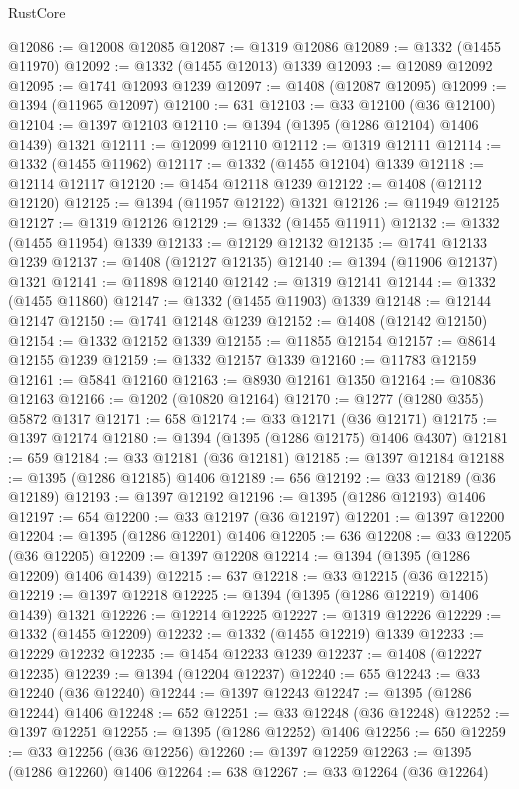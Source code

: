 \begin{lexlean}{RustCore}
\begin{coremodule}
@12086 := @12008 @12085
@12087 := @1319 @12086
@12089 := @1332 (@1455 @11970)
@12092 := @1332 (@1455 @12013) @1339
@12093 := @12089 @12092
@12095 := @1741 @12093 @1239
@12097 := @1408 (@12087 @12095)
@12099 := @1394 (@11965 @12097)
@12100 := 631
@12103 := @33 @12100 (@36 @12100)
@12104 := @1397 @12103
@12110 := @1394 (@1395 (@1286 @12104) @1406 @1439) @1321
@12111 := @12099 @12110
@12112 := @1319 @12111
@12114 := @1332 (@1455 @11962)
@12117 := @1332 (@1455 @12104) @1339
@12118 := @12114 @12117
@12120 := @1454 @12118 @1239
@12122 := @1408 (@12112 @12120)
@12125 := @1394 (@11957 @12122) @1321
@12126 := @11949 @12125
@12127 := @1319 @12126
@12129 := @1332 (@1455 @11911)
@12132 := @1332 (@1455 @11954) @1339
@12133 := @12129 @12132
@12135 := @1741 @12133 @1239
@12137 := @1408 (@12127 @12135)
@12140 := @1394 (@11906 @12137) @1321
@12141 := @11898 @12140
@12142 := @1319 @12141
@12144 := @1332 (@1455 @11860)
@12147 := @1332 (@1455 @11903) @1339
@12148 := @12144 @12147
@12150 := @1741 @12148 @1239
@12152 := @1408 (@12142 @12150)
@12154 := @1332 @12152 @1339
@12155 := @11855 @12154
@12157 := @8614 @12155 @1239
@12159 := @1332 @12157 @1339
@12160 := @11783 @12159
@12161 := @5841 @12160
@12163 := @8930 @12161 @1350
@12164 := @10836 @12163
@12166 := @1202 (@10820 @12164)
@12170 := @1277 (@1280 @355) @5872 @1317
@12171 := 658
@12174 := @33 @12171 (@36 @12171)
@12175 := @1397 @12174
@12180 := @1394 (@1395 (@1286 @12175) @1406 @4307)
@12181 := 659
@12184 := @33 @12181 (@36 @12181)
@12185 := @1397 @12184
@12188 := @1395 (@1286 @12185) @1406
@12189 := 656
@12192 := @33 @12189 (@36 @12189)
@12193 := @1397 @12192
@12196 := @1395 (@1286 @12193) @1406
@12197 := 654
@12200 := @33 @12197 (@36 @12197)
@12201 := @1397 @12200
@12204 := @1395 (@1286 @12201) @1406
@12205 := 636
@12208 := @33 @12205 (@36 @12205)
@12209 := @1397 @12208
@12214 := @1394 (@1395 (@1286 @12209) @1406 @1439)
@12215 := 637
@12218 := @33 @12215 (@36 @12215)
@12219 := @1397 @12218
@12225 := @1394 (@1395 (@1286 @12219) @1406 @1439) @1321
@12226 := @12214 @12225
@12227 := @1319 @12226
@12229 := @1332 (@1455 @12209)
@12232 := @1332 (@1455 @12219) @1339
@12233 := @12229 @12232
@12235 := @1454 @12233 @1239
@12237 := @1408 (@12227 @12235)
@12239 := @1394 (@12204 @12237)
@12240 := 655
@12243 := @33 @12240 (@36 @12240)
@12244 := @1397 @12243
@12247 := @1395 (@1286 @12244) @1406
@12248 := 652
@12251 := @33 @12248 (@36 @12248)
@12252 := @1397 @12251
@12255 := @1395 (@1286 @12252) @1406
@12256 := 650
@12259 := @33 @12256 (@36 @12256)
@12260 := @1397 @12259
@12263 := @1395 (@1286 @12260) @1406
@12264 := 638
@12267 := @33 @12264 (@36 @12264)

\end{coremodule}
\end{lexlean}
